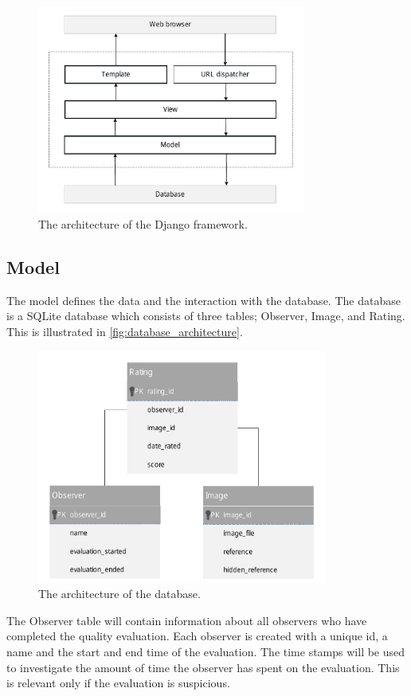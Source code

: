 \begin{figure}[H]
	\centering
	\includegraphics[width = 250pt]{Img/Architecture.pdf}
	\caption{The architecture of the Django framework.}
	\label{fig:django_architecture}
\end{figure}

\subsection{Model} %
\label{sub:model}

The model defines the data and the interaction with the database. The database is a SQLite database which consists of three tables; Observer, Image, and Rating. This is illustrated in \autoref{fig:database_architecture}.

\begin{figure}[H]
	\centering
	\includegraphics[width = 270pt]{Img/model.pdf}
	\caption{The architecture of the database.}
	\label{fig:database_architecture}
\end{figure}

The Observer table will contain information about all observers who have completed the quality evaluation. Each observer is created with a unique id, a name and the start and end time of the evaluation. The time stamps will be used to investigate the amount of time the observer has spent on the evaluation. This is relevant only if the evaluation is suspicious.

